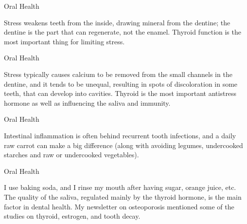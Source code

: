 \documentclass[11pt,oneside,openany,extrafontsizes]{memoir}
\begin{document}
\begin{standalonequote}{Oral Health}

    \begin{answer}
        Stress weakens teeth from the inside, drawing mineral from the dentine; the dentine is the part that can regenerate, not the enamel. Thyroid function is the most important thing for limiting stress.
    \end{answer}
\end{standalonequote}

\begin{standalonequote}{Oral Health}

    \begin{answer}
        Stress typically causes calcium to be removed from the small channels in the dentine, and it tends to be unequal, resulting in spots of discoloration in some teeth, that can develop into cavities. Thyroid is the most important antistress hormone as well as influencing the saliva and immunity.
    \end{answer}
\end{standalonequote}

\begin{standalonequote}{Oral Health}

    \begin{answer}
        Intestinal inflammation is often behind recurrent tooth infections, and a daily raw carrot can make a big difference (along with avoiding legumes, undercooked starches and raw or undercooked vegetables).
    \end{answer}
\end{standalonequote}

\begin{standalonequote}{Oral Health}

    \begin{answer}
        I use baking soda, and I rinse my mouth after having sugar, orange juice, etc. The quality of the saliva, regulated mainly by the thyroid hormone, is the main factor in dental health. My newsletter on osteoporosis mentioned some of the studies on thyroid, estrogen, and tooth decay.
    \end{answer}
\end{standalonequote}
\end{document}

